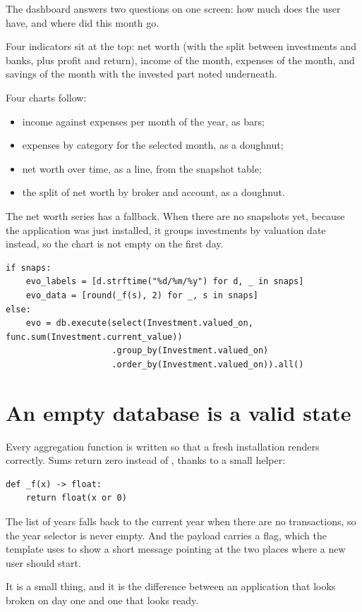 The dashboard answers two questions on one screen: how much does the user have,
and where did this month go.

Four indicators sit at the top: net worth (with the split between investments
and banks, plus profit and return), income of the month, expenses of the month,
and savings of the month with the invested part noted underneath.

Four charts follow:

\begin{itemize}
  \item income against expenses per month of the year, as bars;
  \item expenses by category for the selected month, as a doughnut;
  \item net worth over time, as a line, from the snapshot table;
  \item the split of net worth by broker and account, as a doughnut.
\end{itemize}

The net worth series has a fallback. When there are no snapshots yet, because
the application was just installed, it groups investments by valuation date
instead, so the chart is not empty on the first day.

\begin{lstlisting}[style=py]
if snaps:
    evo_labels = [d.strftime("%d/%m/%y") for d, _ in snaps]
    evo_data = [round(_f(s), 2) for _, s in snaps]
else:
    evo = db.execute(select(Investment.valued_on, func.sum(Investment.current_value))
                     .group_by(Investment.valued_on)
                     .order_by(Investment.valued_on)).all()
\end{lstlisting}

\section{An empty database is a valid state}

Every aggregation function is written so that a fresh installation renders
correctly. Sums return zero instead of , thanks to a small helper:

\begin{lstlisting}[style=py]
def _f(x) -> float:
    return float(x or 0)
\end{lstlisting}

The list of years falls back to the current year when there are no transactions,
so the year selector is never empty. And the payload carries a 
flag, which the template uses to show a short message pointing at the two places
where a new user should start.

It is a small thing, and it is the difference between an application that looks
broken on day one and one that looks ready.
